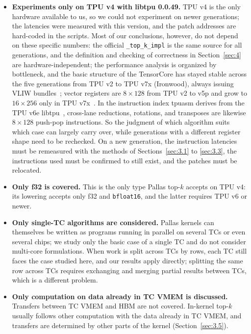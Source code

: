 \documentclass[sigconf,nonacm,balance=false]{acmart}
\newcommand{\code}[1]{\texttt{#1}}
\begin{document}
\begin{itemize}
\item \textbf{Experiments only on TPU v4 with libtpu 0.0.49.} TPU v4 is the only hardware available to us, so we could not experiment on newer generations; the latencies were measured with this version, and the patch addresses are hard-coded in the scripts. Most of our conclusions, however, do not depend on these specific numbers: the official \code{\_\allowbreak{}top\_\allowbreak{}k\_\allowbreak{}impl} is the same source for all generations, and the definition and checking of correctness in Section~\ref{sec:4} are hardware-independent; the performance analysis is organized by bottleneck, and the basic structure of the TensorCore has stayed stable across the five generations from TPU v2 to TPU v7x (Ironwood), always issuing VLIW bundles~\cite{jouppi2026ironwood}; vector registers are $8 \times 128$ from TPU v2 to v5p and grow to $16 \times 256$ only in TPU v7x~\cite{jouppi2026ironwood}. In the instruction index tpuasm derives from the TPU v6e libtpu~\cite{tpuasm}, cross-lane reductions, rotations, and transposes are likewise $8 \times 128$ push-pop instructions. So the judgment of which algorithm suits which case can largely carry over, while generations with a different register shape need to be rechecked. On a new generation, the instruction latencies must be remeasured with the methods of Sections~\ref{sec:3.1} to \ref{sec:3.3}, the instructions used must be confirmed to still exist, and the patches must be relocated.
\item \textbf{Only f32 is covered.} This is the only type Pallas top-$k$ accepts on TPU v4: its lowering accepts only f32 and \code{bfloat16}, and the latter requires TPU v6 or newer.
\item \textbf{Only single-TC algorithms are considered.} Pallas kernels can themselves be written as programs running in parallel on several TCs or even several chips; we study only the basic case of a single TC and do not consider multi-core formulations. When work is split across TCs by rows, each TC still faces the case studied here, and our results apply directly; splitting the same row across TCs requires exchanging and merging partial results between TCs, which is a different problem.
\item \textbf{Only computation on data already in TC VMEM is discussed.} Transfers between TC VMEM and HBM are not covered. In-kernel top-$k$ usually follows other computation with the data already in TC VMEM, and transfers are determined by other parts of the kernel (Section~\ref{sec:3.5}).

\end{itemize}
\end{document}
